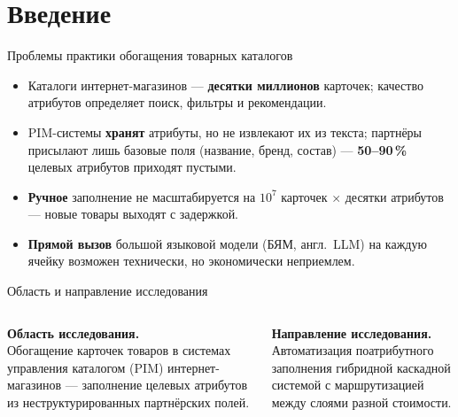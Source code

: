 \documentclass[aspectratio=169, 14pt]{beamer}
\begin{document}
{
    \begin{frame}[plain]
        \titlepage
    \end{frame}
}

\section{Введение}

\begin{frame}{Проблемы практики обогащения товарных каталогов}
\fontsize{10.5pt}{13pt}\selectfont
\begin{itemize}
    \setlength{\itemsep}{0.5em}
    \item Каталоги интернет-магазинов --- \textbf{десятки миллионов} карточек;
          качество атрибутов определяет поиск, фильтры и рекомендации.

    \item PIM-системы \textbf{хранят} атрибуты, но не извлекают их из текста;
          партнёры присылают лишь базовые поля (название, бренд, состав) ---
          \textbf{50--90\,\%} целевых атрибутов приходят пустыми.

    \item \textbf{Ручное} заполнение не масштабируется на $10^7$ карточек
          $\times$ десятки атрибутов --- новые товары выходят с задержкой.

    \item \textbf{Прямой вызов} большой языковой модели (БЯМ, англ.~LLM) на каждую
          ячейку возможен технически, но экономически неприемлем.
\end{itemize}
\end{frame}

\begin{frame}{Область и направление исследования}
\vspace{0.6em}
\fontsize{11pt}{14pt}\selectfont
\begin{columns}[T]
\textbf{Область исследования.}\\[0.4em]
\fontsize{10pt}{13pt}\selectfont
Обогащение карточек товаров в системах управления каталогом (PIM)
интернет-магазинов — заполнение целевых атрибутов из неструктурированных
партнёрских полей.

\fontsize{11pt}{14pt}\selectfont
\textbf{Направление исследования.}\\[0.4em]
\fontsize{10pt}{13pt}\selectfont
Автоматизация поатрибутного заполнения гибридной каскадной системой
с маршрутизацией между слоями разной стоимости.
\end{columns}
\end{frame}
\end{document}
